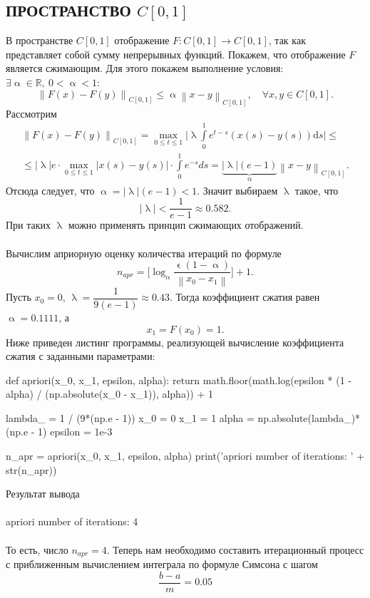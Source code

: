 \documentclass[a4paper, 12pt]{report}
\newcommand\Norm[1]{\left\| #1 \right\|}
\renewcommand{\leq}{\leqslant}
\renewcommand{\alpha}{\upalpha}
\renewcommand{\lambda}{\uplambda}
\renewcommand{\epsilon}{\upvarepsilon}
\begin{document}
		\subsection*{ПРОСТРАНСТВО $C[0,1]$}
		В пространстве $C[0,1]$ отображение $F:C[0,1] \to C[0,1]$, так как представляет собой сумму непрерывных функций. Покажем, что отображение $F$ является сжимающим. Для этого покажем выполнение условия: $\exists \alpha \in \mathbb{R},\ 0<\alpha<1:$ $$\Norm{F(x) - F(y)}_{C[0,1]} \leq \alpha\Norm{x - y}_{C[0,1]},\quad \forall x,y \in {C[0,1]}.$$
		Рассмотрим \begin{multline*}
			\Norm{F(x) - F(y)}_{C[0,1]} = \underset{0\leq t \leq 1}{\max} \Big|\lambda \int\limits_0^1e^{t-s} (x(s) - y(s))\mathrm{d} s\Big| \leq\\ \leq |\lambda|e\cdot  \underset{0\leq t \leq 1}{\max} |x(s) - y(s)| \cdot\int\limits_0^1e^{-s} ds = \underbrace{|\lambda| (e-1)}_\alpha \Norm{x - y}_{C[0,1]}.
		\end{multline*}
		Отсюда следует, что $\alpha = |\lambda| (e-1) < 1$. Значит выбираем $\lambda$ такое, что $$|\lambda| < \dfrac{1}{e - 1}\approx 0.582.$$ При таких $\lambda$ можно применять принцип сжимающих отображений. \\\\
		Вычислим априорную оценку количества итераций по формуле $$n_{apr} = \Big[\log_\alpha \dfrac{\epsilon(1-\alpha)}{\Norm{x_0 - x_1}}\Big] + 1.$$
		Пусть $x_0 = 0$, $\lambda = \dfrac{1}{9(e-1)}\approx 0.43$. Тогда коэффициент сжатия равен $\alpha = 0.1111$, а $$x_1 = F(x_0) = 1.$$ Ниже приведен листинг программы, реализующей вычисление коэффициента сжатия с заданными параметрами:
		\begin{python}
			def apriori(x_0, x_1, epsilon, alpha):
				return math.floor(math.log(epsilon * (1 - alpha) / (np.absolute(x_0 - x_1)), alpha)) + 1
			
			lambda_ = 1 / (9*(np.e - 1))
			x_0 = 0
			x_1 = 1
			alpha = np.absolute(lambda_)*(np.e - 1)
			epsilon = 1e-3
			
			n_apr = apriori(x_0, x_1, epsilon, alpha)
			print('apriori number of iterations: ' + str(n_apr))\end{python}
			Результат вывода\\\\
			apriori number of iterations: 4\\\\
			То есть, число $n_{apr} =4.$
			Теперь нам необходимо составить итерационный процесс с приближенным вычислением интеграла по формуле Симсона с шагом $$\dfrac{b-a}{m} = 0.05$$
\end{document}
